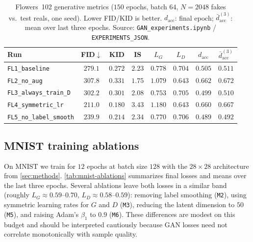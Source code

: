 \documentclass{article}
\theoremstyle{plain}
\theoremstyle{definition}
\theoremstyle{remark}
\begin{document}
\begin{table}[t]
\caption{Flowers~102 generative metrics ($150$ epochs, batch $64$, $N=2048$ fakes vs.\ test reals, one seed). Lower FID/KID is better. $d_{\mathrm{acc}}$: final epoch; $\bar{d}_{\mathrm{acc}}^{(3)}$: mean over last three epochs. Source: \texttt{GAN\_experiments.ipynb} / \texttt{EXPERIMENTS\_JSON}.}
\label{tab:flowers-fid}
\vskip 0.1in
\begin{center}
\begin{small}
\begin{sc}
\begin{tabular}{lccccccc}
\toprule
Run & FID$\downarrow$ & KID & IS & $L_G$ & $L_D$ & $d_{\mathrm{acc}}$ & $\bar{d}_{\mathrm{acc}}^{(3)}$ \\
\midrule
\texttt{FL1\_baseline} & $279.1$ & $0.272$ & $2.23$ & $0.778$ & $0.704$ & $0.505$ & $0.511$ \\
\texttt{FL2\_no\_aug} & $307.8$ & $0.331$ & $1.75$ & $1.079$ & $0.643$ & $0.662$ & $0.672$ \\
\texttt{FL3\_always\_train\_D} & $302.2$ & $0.301$ & $2.08$ & $0.753$ & $0.705$ & $0.499$ & $0.510$ \\
\texttt{FL4\_symmetric\_lr} & $211.0$ & $0.180$ & $3.43$ & $1.180$ & $0.643$ & $0.660$ & $0.667$ \\
\texttt{FL5\_no\_label\_smooth} & $239.9$ & $0.214$ & $2.34$ & $0.770$ & $0.706$ & $0.489$ & $0.492$ \\
\bottomrule
\end{tabular}
\end{sc}
\end{small}
\end{center}
\vskip -0.1in
\end{table}

\subsection{MNIST training ablations}

On MNIST we train for $12$ epochs at batch size $128$ with the $28\times 28$ architecture from \cref{sec:methods}. \cref{tab:mnist-ablations} summarizes final losses and means over the last three epochs. Several ablations leave both losses in a similar band (roughly $L_G\approx 0.59$--$0.70$, $L_D\approx 0.58$--$0.59$): removing label smoothing (\texttt{M2}), using symmetric learning rates for $G$ and $D$ (\texttt{M3}), reducing the latent dimension to $50$ (\texttt{M5}), and raising Adam's $\beta_1$ to $0.9$ (\texttt{M6}). These differences are modest on this budget and should be interpreted cautiously because GAN losses need not correlate monotonically with sample quality.
\end{document}
